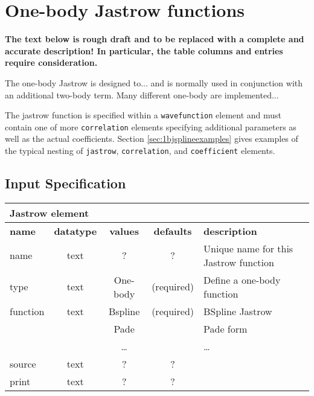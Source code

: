\section{One-body Jastrow functions}
\label{sec:onebodyjastrow}

\textbf{The text below is rough draft and to be replaced with a
  complete and accurate description! In particular, the table columns
  and entries require consideration. }

The one-body Jastrow is designed to... and is normally used in
conjunction with an additional two-body term. Many different one-body
are implemented...

The jastrow function is specified within a \texttt{wavefunction} element
and must contain one of more \texttt{correlation} elements specifying
additional parameters as well as the actual coefficients. Section
\ref{sec:1bjsplineexamples} gives examples of the typical nesting of
\texttt{jastrow}, \texttt{correlation}, and \texttt{coefficient} elements.

\subsection{Input Specification}

\begin{table}[h]
\begin{center}
\begin{tabular}{l c c c l }
\hline
\multicolumn{5}{l}{Jastrow element} \\
\hline
\bfseries name & \bfseries datatype & \bfseries values & \bfseries defaults  & \bfseries description \\
\hline
name & text & ? & ? & Unique name for this Jastrow function \\
type & text & One-body & (required) & Define a one-body function \\ 
function & text & Bspline & (required) & BSpline Jastrow \\
             &          & Pade & & Pade form \\
             &          & \ldots & & \ldots \\
source & text & ? & ? & \\ 
print & text & ? &  ? & \\
  \hline
\end{tabular}
\end{center}
\end{table}


